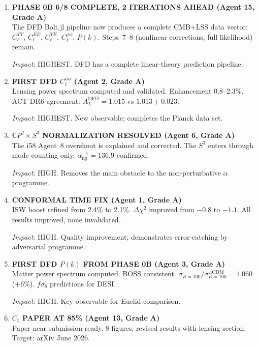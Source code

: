 \documentclass[11pt,a4paper]{article}
\newcommand{\CP}{\mathbb{C}P}
\begin{document}
\begin{enumerate}[label=\textbf{\arabic*.}, leftmargin=1.5cm]

\item \textbf{PHASE 0B 6/8 COMPLETE, 2 ITERATIONS AHEAD (Agent 15, Grade A)}\\
The DFD Bolt.jl pipeline now produces a complete CMB+LSS data vector: $C_\ell^{TT}$, $C_\ell^{EE}$, $C_\ell^{TE}$, $C_\ell^{\phi\phi}$, $P(k)$. Steps~7--8 (nonlinear corrections, full likelihood) remain.

\textit{Impact}: HIGHEST. DFD has a complete linear-theory prediction pipeline.

\item \textbf{FIRST DFD $C_\ell^{\phi\phi}$ (Agent 2, Grade A)}\\
Lensing power spectrum computed and validated. Enhancement 0.8--2.3\%. ACT DR6 agreement: $A_L^{\mathrm{DFD}} = 1.015$ vs $1.013 \pm 0.023$.

\textit{Impact}: HIGHEST. New observable; completes the Planck data set.

\item \textbf{$\CP^2 \times S^3$ NORMALIZATION RESOLVED (Agent 6, Grade A)}\\
The i58 Agent~8 overshoot is explained and corrected. The $S^3$ enters through mode counting only. $\alpha^{-1}_{\mathrm{np}} = 136.9$ confirmed.

\textit{Impact}: HIGH. Removes the main obstacle to the non-perturbative $\alpha$ programme.

\item \textbf{CONFORMAL TIME FIX (Agent 1, Grade A)}\\
ISW boost refined from 2.4\% to 2.1\%. $\Delta\chi^2$ improved from $-0.8$ to $-1.1$. All results improved, none invalidated.

\textit{Impact}: HIGH. Quality improvement; demonstrates error-catching by adversarial programme.

\item \textbf{FIRST DFD $P(k)$ FROM PHASE 0B (Agent 3, Grade A)}\\
Matter power spectrum computed. BOSS consistent. $\sigma_{R=100} / \sigma_{R=100}^{\Lambda\mathrm{CDM}} = 1.060$ ($+6\%$). $f\sigma_8$ predictions for DESI.

\textit{Impact}: HIGH. Key observable for Euclid comparison.

\item \textbf{$C_\ell$ PAPER AT 85\% (Agent 13, Grade A)}\\
Paper near submission-ready. 8 figures, revised results with lensing section. Target: arXiv June 2026.


\end{enumerate}
\end{document}
